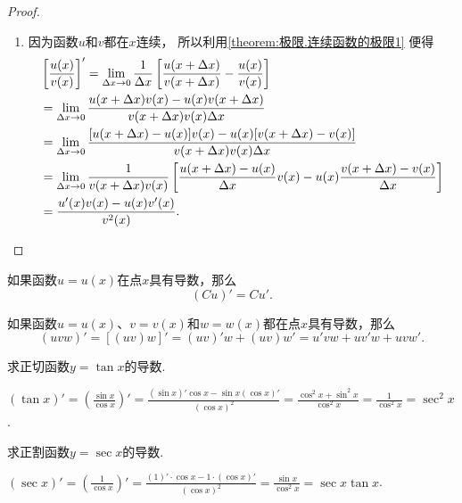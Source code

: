 \begin{theorem}
\begin{proof}
\begin{enumerate}
\item 因为函数\(u\)和\(v\)都在\(x\)连续，
所以利用\cref{theorem:极限.连续函数的极限1} 便得
\begin{align*}
&\left[ \frac{u(x)}{v(x)} \right]'
= \lim_{\Delta x\to0} \frac{1}{\Delta x} \left[
 \frac{u(x+\Delta x)}{v(x+\Delta x)} - \frac{u(x)}{v(x)}
 \right] \\
&= \lim_{\Delta x\to0} \frac{u(x+\Delta x) v(x) - u(x) v(x+\Delta x)}{v(x+\Delta x) v(x) \Delta x} \\
&= \lim_{\Delta x\to0} \frac{[u(x+\Delta x) - u(x)] v(x) - u(x) [v(x+\Delta x) - v(x)]}{v(x+\Delta x) v(x) \Delta x} \\
&= \lim_{\Delta x\to0} \frac{1}{v(x+\Delta x) v(x)} \left[
 \frac{u(x+\Delta x) - u(x)}{\Delta x} v(x) - u(x) \frac{v(x+\Delta x) - v(x)}{\Delta x}
 \right] \\
&= \frac{u'(x) v(x) - u(x) v'(x)}{v^2(x)}.
\qedhere
\end{align*}
\end{enumerate}
\end{proof}
\end{theorem}

\begin{corollary}
如果函数\(u=u(x)\)在点\(x\)具有导数，那么\[
(C u)' = C u'.
\]
\end{corollary}

\begin{corollary}
如果函数\(u=u(x)\)、\(v=v(x)\)和\(w=w(x)\)都在点\(x\)具有导数，那么\[
(uvw)' = [(uv)w]' = (uv)'w + (uv)w' = u'vw + uv'w + uvw'.
\]
\end{corollary}

\begin{example}
求正切函数\(y=\tan x\)的导数.
\begin{solution}
\((\tan x)'
= \left(\frac{\sin x}{\cos x}\right)'
= \frac{(\sin x)' \cos x - \sin x (\cos x)'}{(\cos x)^2}
= \frac{\cos^2 x + \sin^2 x}{\cos^2 x}
= \frac{1}{\cos^2 x}
= \sec^2 x\).
\end{solution}
\end{example}

\begin{example}
求正割函数\(y=\sec x\)的导数.
\begin{solution}
\((\sec x)'
= \left(\frac{1}{\cos x}\right)'
= \frac{(1)' \cdot \cos x - 1 \cdot (\cos x)'}{(\cos x)^2}
= \frac{\sin x}{\cos^2 x}
= \sec x \tan x\).
\end{solution}
\end{example}

